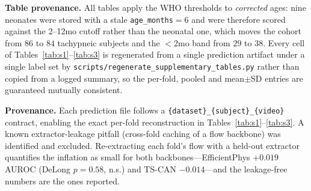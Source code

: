 \documentclass[journal]{IEEEtran}
\begin{document}
\textbf{Table provenance.} All tables apply the WHO thresholds to \emph{corrected} ages: nine neonates
were stored with a stale \texttt{age\_months}${=}6$ and were therefore scored against the 2--12mo cutoff
rather than the neonatal one, which moves the cohort from $86$ to $84$ tachypneic subjects and the
$<$2mo band from $29$ to $38$. Every cell of Tables~\ref{tab:s1}--\ref{tab:s3} is regenerated from a
single prediction artifact under a single label set by
\texttt{scripts/regenerate\_supplementary\_tables.py} rather than copied from a logged summary, so the
per-fold, pooled and mean$\pm$SD entries are guaranteed mutually consistent.

\textbf{Provenance.} Each prediction file follows a \texttt{\{dataset\}\_\{subject\}\_\{video\}}
contract, enabling the exact per-fold reconstruction in Tables~\ref{tab:s1}--\ref{tab:s3}. A known
extractor-leakage pitfall (cross-fold caching of a flow backbone) was identified and excluded. Re-extracting
each fold's flow with a held-out extractor quantifies the inflation as small for both backbones---EfficientPhys
$+0.019$ AUROC (DeLong $p=0.58$, n.s.) and TS-CAN $-0.014$---and the leakage-free numbers are the ones reported.






\end{document}
